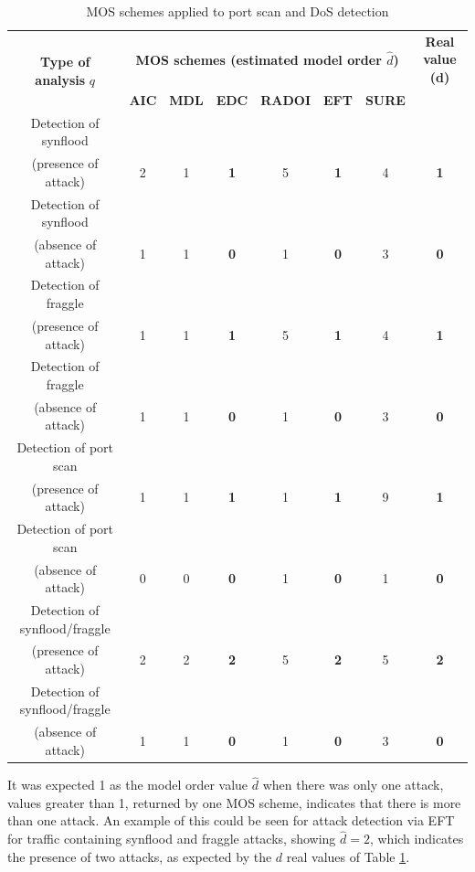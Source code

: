 \documentclass{bmcart}
\begin{document}
\begin{table}[h!]
  \centering
  \footnotesize
  \caption{MOS schemes applied to port scan and DoS detection}
  \label{tab:tab4}
  \begin{tabular}{ c c c c c c c c }
	\toprule
	\multirow{2}{*}{\textbf{Type of analysis} $q$} &\multicolumn{6}{c}{\textbf{MOS schemes (estimated model order $\hat{d}$)}} &{\textbf{Real value (d)}}\\ 
			\hhline{~------~}
		&\textbf{AIC} &\textbf{MDL} &\textbf{EDC} &\textbf{RADOI} &\textbf{EFT} &\textbf{SURE}\\
	\midrule
	Detection of synflood \\(presence of attack) &2 &1 &\textbf{1} &5 &\textbf{1} &4 &\textbf{1} \\
	Detection of synflood \\(absence of attack) &1 &1 &\textbf{0} &1 &\textbf{0} &3 &\textbf{0} \\
	\midrule
	Detection of fraggle \\(presence of attack) &1 &1 &\textbf{1} &5 &\textbf{1} &4 &\textbf{1} \\
	Detection of fraggle \\(absence of attack) &1 &1 &\textbf{0} &1 &\textbf{0} &3 &\textbf{0} \\
	\midrule
	Detection of port scan \\(presence of attack) &1 &1 &\textbf{1} &1 &\textbf{1} &9 &\textbf{1} \\
	Detection of port scan \\(absence of attack) &0 &0 &\textbf{0} &1 &\textbf{0} &1 &\textbf{0} \\
	\midrule
	Detection of synflood/fraggle \\(presence of attack) &2 &2 &\textbf{2} &5 &\textbf{2} &5 &\textbf{2} \\
	Detection of synflood/fraggle \\(absence of attack) &1 &1 &\textbf{0} &1 &\textbf{0} &3 &\textbf{0} \\
    \bottomrule
  \end{tabular}
\end{table}

It was expected 1 as the model order value $\hat{d}$ when there was only one attack, values greater than 1, returned by one MOS scheme, indicates that there is more than one attack. An example of this could be seen for attack detection via EFT for traffic containing synflood and fraggle attacks, showing $\hat{d} = 2$, which indicates the presence of two attacks, as expected by the $d$ real values of Table \ref{tab:tab4}. 
\end{document}
